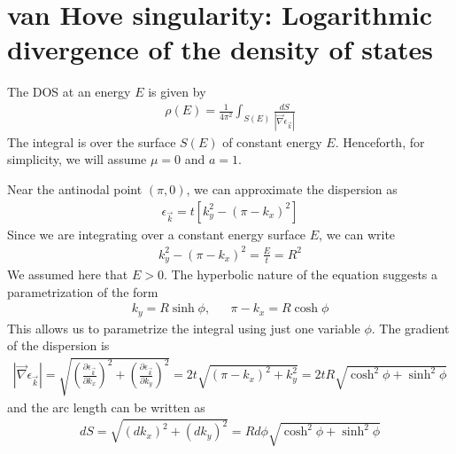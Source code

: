\documentclass{article}
\begin{document}
\section{van Hove singularity: Logarithmic divergence of the density of states}
The DOS at an energy $E$ is given by
\begin{equation}\begin{aligned}
	\rho(E) = \frac{1}{4\pi^2}\int_{S(E)} \frac{dS}{|\vec \nabla \epsilon_{\vec{k}}|}
\end{aligned}\end{equation}
The integral is over the surface \(S(E)\) of constant energy $E$. Henceforth, for simplicity, we will assume \(\mu=0\) and \(a=1\). 

Near the antinodal point \(\left(\pi, 0\right) \), we can approximate the dispersion as
\begin{equation}\begin{aligned}
	\epsilon_{\vec k} = t\left[k_y^2 - \left( \pi - k_x \right) ^2\right] 
\end{aligned}\end{equation}
Since we are integrating over a constant energy surface \(E \), we can write
\begin{equation}\begin{aligned}
	k_y^2 - \left( \pi - k_x \right)^2 = \frac{E}{t} = R^2
\end{aligned}\end{equation}
We assumed here that \(E > 0\). The hyperbolic nature of the equation suggests a parametrization of the form
\begin{equation}\begin{aligned}
	k_y = R\sinh \phi, &&\pi - k_x = R\cosh \phi
\end{aligned}\end{equation}
This allows us to parametrize the integral using just one variable \(\phi\). The gradient of the dispersion is
\begin{equation}\begin{aligned}
	|\vec \nabla \epsilon_{\vec{k}}| = \sqrt{\left(\frac{\partial{\epsilon_{\vec k}}}{\partial{k_x}}\right)^2 + \left(\frac{\partial{\epsilon_{\vec k}}}{\partial{k_y}}\right)^2} = 2t\sqrt{\left(\pi - k_x\right)^2 + k_y^2} = 2tR\sqrt{\cosh^2\phi + \sinh^2\phi}
\end{aligned}\end{equation}
and the arc length can be written as
\begin{equation}\begin{aligned}
	dS = \sqrt{(dk_x)^2 + (dk_y)^2} = Rd\phi\sqrt{\cosh^2\phi + \sinh^2\phi}
\end{aligned}\end{equation}
\end{document}
